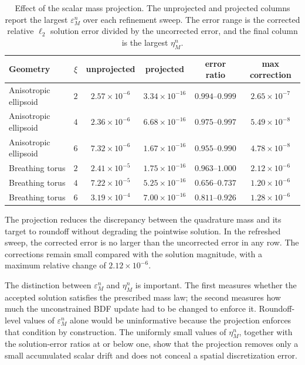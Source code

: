 \documentclass[a4paper,fleqn]{cas-sc}
\begin{document}
\begin{table}[!htbp]
\centering
\caption{Effect of the scalar mass projection.  The unprojected and projected
columns report the largest \(\varepsilon_M^n\) over each refinement sweep.  The
error range is the corrected relative \(\ell_2\) solution error divided by the
uncorrected error, and the final column is the largest \(\eta_M^n\).}
\scriptsize
\setlength{\tabcolsep}{3pt}
\label{tab:mass-correction-results}
\begin{tabular}{l c c c c c}
\toprule
Geometry & \(\xi\) & unprojected & projected &
error ratio & max correction \\
\midrule
Anisotropic ellipsoid & \(2\) &
\(2.57{\times}10^{-6}\) & \(3.34{\times}10^{-16}\) &
\(0.994\text{--}0.999\) & \(2.65{\times}10^{-7}\) \\
Anisotropic ellipsoid & \(4\) &
\(2.36{\times}10^{-6}\) & \(6.68{\times}10^{-16}\) &
\(0.975\text{--}0.997\) & \(5.49{\times}10^{-8}\) \\
Anisotropic ellipsoid & \(6\) &
\(7.32{\times}10^{-6}\) & \(1.67{\times}10^{-16}\) &
\(0.955\text{--}0.990\) & \(4.78{\times}10^{-8}\) \\
Breathing torus & \(2\) &
\(2.41{\times}10^{-5}\) & \(1.75{\times}10^{-16}\) &
\(0.963\text{--}1.000\) & \(2.12{\times}10^{-6}\) \\
Breathing torus & \(4\) &
\(7.22{\times}10^{-5}\) & \(5.25{\times}10^{-16}\) &
\(0.656\text{--}0.737\) & \(1.20{\times}10^{-6}\) \\
Breathing torus & \(6\) &
\(3.19{\times}10^{-4}\) & \(7.00{\times}10^{-16}\) &
\(0.811\text{--}0.926\) & \(1.28{\times}10^{-6}\) \\
\bottomrule
\end{tabular}
\end{table}

The projection reduces the discrepancy between the quadrature mass and its
target to roundoff without degrading the pointwise solution.  In the refreshed
sweep, the corrected error is no larger than the uncorrected error in any row.
The corrections remain small compared with the solution magnitude, with a
maximum relative change of \(2.12\times10^{-6}\).

The distinction between \(\varepsilon_M^n\) and \(\eta_M^n\) is important.
The first measures whether the accepted solution satisfies the prescribed mass
law; the second measures how much the unconstrained BDF update had to be
changed to enforce it.  Roundoff-level values of \(\varepsilon_M^n\) alone
would be uninformative because the projection enforces that condition by
construction.  The uniformly small values of \(\eta_M^n\), together with the
solution-error ratios at or below one, show that the projection removes only a
small accumulated scalar drift and does not conceal a spatial discretization
error.
\end{document}
